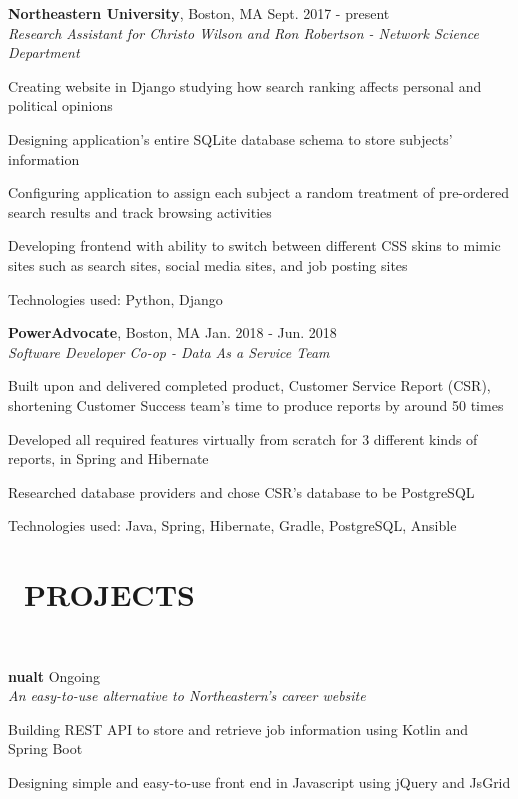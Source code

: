 \documentclass[11pt]{res}
\newcommand{\sectionunderline}{\vspace{-3mm}\hrulefill\\}
\newcommand{\newsect}[1]{\section{\Large \bf #1}}
\begin{document}
\begin{resume}
{{      {\bf Northeastern University}, Boston, MA \hfill Sept. 2017 - present\\
      {\it Research Assistant for Christo Wilson and Ron Robertson - Network Science Department}
      \begin{itemize}
        {\item Creating website in Django studying how search ranking affects personal and political opinions}
        {\item Designing application's entire SQLite database schema to store subjects' information}
        {\item Configuring application to assign each subject a random treatment of pre-ordered search results and track browsing activities}
        {\item Developing frontend with ability to switch between different CSS skins to mimic sites such as search sites, social media sites, and job posting sites}
        {\item Technologies used: Python, Django}
      \end{itemize}

      {\bf PowerAdvocate}, Boston, MA \hfill Jan. 2018 - Jun. 2018\\
      {\it Software Developer Co-op - Data As a Service Team}
      \begin{itemize}
        {\item Built upon and delivered completed product, Customer Service Report (CSR), shortening Customer Success team's time to produce reports by around 50 times}
        {\item Developed all required features virtually from scratch for 3 different kinds of reports, in Spring and Hibernate}
        {\item Researched database providers and chose CSR's database to be PostgreSQL}
        {\item Technologies used: Java, Spring, Hibernate, Gradle, PostgreSQL, Ansible}
      \end{itemize}
    }
  }

  \newsect{\faGithubAlt\ PROJECTS}{
    \sectionunderline{
      {\bf nualt} \hfill Ongoing\\
      {\it An easy-to-use alternative to Northeastern's career website}
      \begin{itemize}
        {\item {}}
        {\item Building REST API to store and retrieve job information using Kotlin and Spring Boot}
        {\item Designing simple and easy-to-use front end in Javascript using jQuery and JsGrid}
      \end{itemize}
    }
  }
\end{resume}
\end{document}
